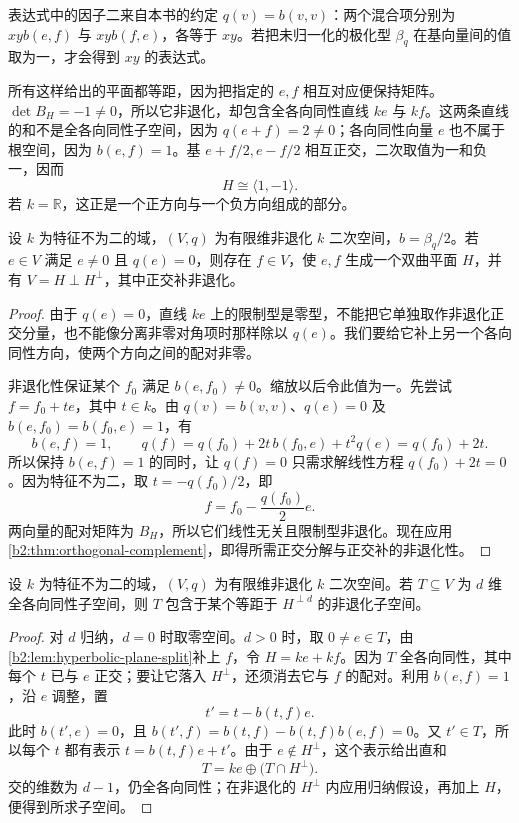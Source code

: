 表达式中的因子二来自本书的约定 \(q(v)=b(v,v)\)：两个混合项分别为 \(xyb(e,f)\) 与 \(xyb(f,e)\)，各等于 \(xy\)。若把未归一化的极化型 \(\beta_q\) 在基向量间的值取为一，才会得到 \(xy\) 的表达式。

\ProseParagraphBreak
所有这样给出的平面都等距，因为把指定的 \(e,f\) 相互对应便保持矩阵。\(\det B_H=-1\ne0\)，所以它非退化，却包含全各向同性直线 \(ke\) 与 \(kf\)。这两条直线的和不是全各向同性子空间，因为 \(q(e+f)=2\ne0\)；各向同性向量 \(e\) 也不属于根空间，因为 \(b(e,f)=1\)。基 \(e+f/2,e-f/2\) 相互正交，二次取值为一和负一，因而
\[
	H\cong\langle1,-1\rangle.
\]
若 \(k=\mathbb R\)，这正是一个正方向与一个负方向组成的部分。

\begin{lemma}[双曲平面的分离]\label{b2:lem:hyperbolic-plane-split}
	设 \(k\) 为特征不为二的域，\((V,q)\) 为有限维非退化 \(k\) 二次空间，\(b=\beta_q/2\)。若 \(e\in V\) 满足 \(e\ne0\) 且 \(q(e)=0\)，则存在 \(f\in V\)，使 \(e,f\) 生成一个双曲平面 \(H\)，并有 \(V=H\perp H^\perp\)，其中正交补非退化。
\end{lemma}
\begin{proof}
	由于 \(q(e)=0\)，直线 \(ke\) 上的限制型是零型，不能把它单独取作非退化正交分量，也不能像分离非零对角项时那样除以 \(q(e)\)。我们要给它补上另一个各向同性方向，使两个方向之间的配对非零。

	非退化性保证某个 \(f_0\) 满足 \(b(e,f_0)\ne0\)。缩放以后令此值为一。先尝试 \(f=f_0+te\)，其中 \(t\in k\)。由 \(q(v)=b(v,v)\)、\(q(e)=0\) 及 \(b(e,f_0)=b(f_0,e)=1\)，有
	\[
		b(e,f)=1,\qquad q(f)=q(f_0)+2t\,b(f_0,e)+t^2q(e)=q(f_0)+2t.
	\]
	所以保持 \(b(e,f)=1\) 的同时，让 \(q(f)=0\) 只需求解线性方程 \(q(f_0)+2t=0\)。因为特征不为二，取 \(t=-q(f_0)/2\)，即
	\[
		f=f_0-\frac{q(f_0)}2e.
	\]
	两向量的配对矩阵为 \(B_H\)，所以它们线性无关且限制型非退化。现在应用\cref{b2:thm:orthogonal-complement}，即得所需正交分解与正交补的非退化性。
\end{proof}

\begin{proposition}\label{b2:prop:isotropic-subspace-hyperbolic}
	设 \(k\) 为特征不为二的域，\((V,q)\) 为有限维非退化 \(k\) 二次空间。若 \(T\subseteq V\) 为 \(d\) 维全各向同性子空间，则 \(T\) 包含于某个等距于 \(H^{\perp d}\) 的非退化子空间。
\end{proposition}
\begin{proof}
	对 \(d\) 归纳，\(d=0\) 时取零空间。\(d>0\) 时，取 \(0\ne e\in T\)，由\cref{b2:lem:hyperbolic-plane-split}补上 \(f\)，令 \(H=ke+kf\)。因为 \(T\) 全各向同性，其中每个 \(t\) 已与 \(e\) 正交；要让它落入 \(H^\perp\)，还须消去它与 \(f\) 的配对。利用 \(b(e,f)=1\)，沿 \(e\) 调整，置
	\[
		t'=t-b(t,f)e.
	\]
	此时 \(b(t',e)=0\)，且 \(b(t',f)=b(t,f)-b(t,f)b(e,f)=0\)。又 \(t'\in T\)，所以每个 \(t\) 都有表示 \(t=b(t,f)e+t'\)。由于 \(e\notin H^\perp\)，这个表示给出直和
	\[
		T=ke\oplus\bigl(T\cap H^\perp\bigr).
	\]
	交的维数为 \(d-1\)，仍全各向同性；在非退化的 \(H^\perp\) 内应用归纳假设，再加上 \(H\)，便得到所求子空间。
\end{proof}

